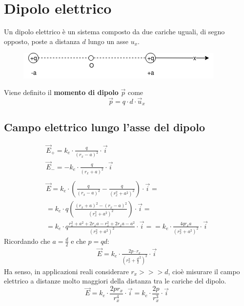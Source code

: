 \section{Dipolo elettrico}
Un dipolo elettrico è un sistema composto da due cariche uguali, di segno opposto, poste a distanza $d$ lungo un asse $u_x$.\\
\begin{figure}[h!]
	\centering
    \includegraphics[scale=0.6]{Pictures/DipoloElettrico}
\end{figure}
Viene definito il \textbf{momento di dipolo} $\vec{p}$ come 
\begin{displaymath}
	\vec{p} = q \cdot d \cdot \vec{u}_x
\end{displaymath}

\subsection{Campo elettrico lungo l'asse del dipolo}
\begin{displaymath}\begin{aligned}
	\vec{E}_+ = k_e \cdot \frac{q}{(r_x - a)^2} \cdot \vec{i}\\
    \vec{E}_- = - k_e \cdot \frac{q}{(r_x + a)^2} \cdot \vec{i}\\\\
    \vec{E} = k_e \cdot \left(\frac{q}{(r_x - a)^2} - \frac{q}{(r_x^2 + a^2)^2} \right) \cdot \vec{i} = \\
    = k_e \cdot q \left( \frac{(r_x + a)^2 - (r_x - a)^2}{(r_x^2 + a^2)^2} \right) \cdot \vec{i} = \\
    = k_e \cdot q \frac{r_x^2 + a^2 + 2 r_x a - r_x^2 +2 r_x a - a^2}{(r_x^2 + a^2)^2} \cdot \vec{i} = 
    = k_e \cdot \frac{4 q r_x a}{(r_x^2 + a^2)^2} \cdot \vec{i}
\end{aligned}\end{displaymath}
Ricordando che $a = \frac{d}{2}$ e che $p = qd$:
\begin{displaymath}\begin{aligned}
	\vec{E} = k_e \cdot \frac{2p\cdot r_x}{(r_x^2 + \frac{d}{2}^2)^2} \cdot \vec{i}    
\end{aligned}\end{displaymath}
Ha senso, in applicazioni reali considerare $r_x >>> d$, cioè misurare il campo elettrico a distanze molto maggiori della distanza tra le cariche del dipolo.
\begin{displaymath}
\vec{E} = k_e \cdot \frac{2 p r_x}{r_x^4} \cdot \vec{i} = k_e \cdot \frac{2p}{r_x^3} \cdot \vec{i}
\end{displaymath}

